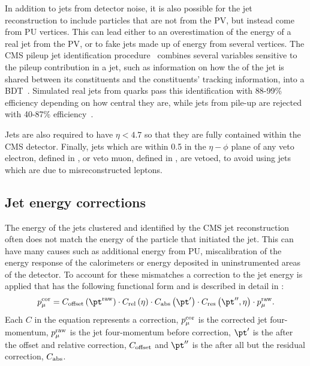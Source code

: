 In addition to jets from detector noise, it is also possible for the jet reconstruction to include particles that are not from the \ac{PV}, but instead come from \ac{PU} vertices. This can lead either to an overestimation of the energy of a real jet from the \ac{PV}, or to fake jets made up of energy from several vertices. The CMS pileup jet identification procedure~\cite{CMS-PAS-JME-13-005} combines several variables sensitive to the pileup contribution in a jet, such as information on how the \pt of the jet is shared between its constituents and the constituents' tracking information, into a \ac{BDT}~\cite{TMVA}. Simulated real jets from quarks pass this identification with 88-99\% efficiency depending on how central they are, while jets from pile-up are rejected with 40-87\% efficiency~\cite{CMS-PAS-JME-13-005}.

Jets are also required to have $\eta<4.7$ so that they are fully contained within the CMS detector. Finally, jets which are within 0.5 in the $\eta-\phi$ plane of any veto electron, defined in , or veto muon, defined in , are vetoed, to avoid using jets which are due to misreconstructed leptons.

\subsection{Jet energy corrections}
\label{sec:jec}
The energy of the jets clustered and identified by the CMS jet reconstruction often does not match the energy of the particle that initiated the jet. This can have many causes such as additional energy from \ac{PU}, miscalibration of the energy response of the calorimeters or energy deposited in uninstrumented areas of the detector. To account for these mismatches a correction to the jet energy is applied that has the following functional form and is described in detail in : 
\begin{equation}
  p_{\mu}^{\rm{cor}}=C_{\rm{offset}}\left(\pt^{\rm{raw}}\right)\cdot C_{\rm{rel}}\left(\eta\right)\cdot C_{\rm{abs}}\left(\pt'\right)\cdot C_{\rm{res}}\left(\pt'',\eta\right)\cdot p_{\mu}^{\rm{raw}}.
\end{equation}
Each $C$ in the equation represents a correction, $p_{\mu}^{\rm{cor}}$ is the corrected jet four-momentum, $p_{\mu}^{\rm{raw}}$ is the jet four-momentum before correction, $\pt'$ is the \pt after the offset and relative correction, $C_{\rm{offset}}$ and $\pt''$ is the \pt after all but the residual correction, $C_{\rm{abs}}$.

